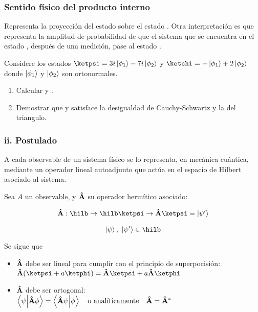      \subsubsection{Sentido físico del producto interno}
         \braketba Representa la proyección del estado \ketpsi sobre el estado \ketphi. Otra interpretación es que representa la amplitud de probabilidad de que el sistema que se encuentra en el estado \ketpsi, después de una medición, pase al estado \ketphi.

         \begin{example}[Operadores]
             Considere los estados $\ketpsi=3i\ket{\phi_1}-7i\ket{\phi_2}$ y $\ketchi=-\ket{\phi_1}+2\ket{\phi_2}$ donde $\ket{\phi_1}$ y $\ket{\phi_2}$ son ortonormales.
             \begin{enumerate}
                 \item Calcular \braketac y \braketca.
                 \item Demostrar que \ketpsi y \ketchi satisface la desigualdad de Cauchy-Schwartz y la del triangulo.
             \end{enumerate}

         \end{example}

     \subsubsection{ii. Postulado}

         A cada observable de un sistema físico se lo representa, en mecánica cuántica, mediante un operador lineal autoadjunto que actúa en el espacio de Hilbert \hilb asociado al sistema.

         Sea $A$ un observable, y $\vu{A}$ su operador hermítico asociado:

         \begin{align*}
             \vu{A}:\hilb\then\hilb
             \ketpsi\then\vu{A}\ketpsi=\ket{\psi'}
         \end{align*}

         $$
             \ket{\psi},~\ket{\psi'}\in\hilb
         $$

         Se sigue que

         \begin{itemize}
             \item $\vu{A}$ debe ser lineal para cumplir con el principio de superpocisión:\\
                   $\vu{A}(\ketpsi+a\ketphi)=\vu{A}\ketpsi+a\vu{A}\ketphi$
             \item $\vu{A}$ debe ser ortogonal:\\
                   $ \braket{\psi}{\vu{A}\phi}=\braket{\vu{A}\psi}{\phi}\qq{o analíticamente}\vu{A}=\vu{A}^*$
         \end{itemize}

